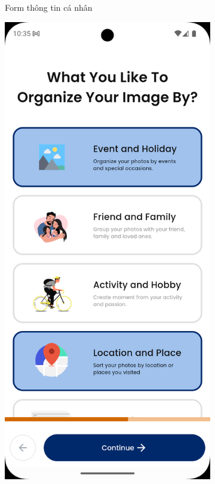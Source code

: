 \begin{figure}[H]
\begin{subfigure}{0.32\textwidth}
        \caption{Form thông tin cá nhân}
        \label{fig:basic-info}
    \end{subfigure}
    \hfill
    \begin{subfigure}{0.32\textwidth}
        \includegraphics[width=1\linewidth]{figures/c4/4-2/basic_info_3.png} 

\end{subfigure}
\end{figure}
